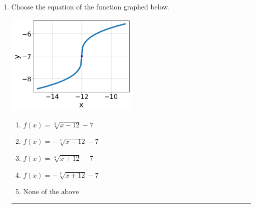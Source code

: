 \documentclass[14pt]{extbook}
\newcommand{\litem}[1]{\item#1\hspace*{-1cm}\rule{\textwidth}{0.4pt}}
\begin{document}
\begin{enumerate}
{\begin{enumerate}[label=\Alph*.]
\end{enumerate} }
\litem{
Choose the equation of the function graphed below.
\begin{center}
    \includegraphics[width=0.5\textwidth]{../Figures/radicalGraphToEquationC.png}
\end{center}
\begin{enumerate}[label=\Alph*.]
\item \( f(x) = \sqrt[3]{x - 12} - 7 \)
\item \( f(x) = - \sqrt[3]{x - 12} - 7 \)
\item \( f(x) = \sqrt[3]{x + 12} - 7 \)
\item \( f(x) = - \sqrt[3]{x + 12} - 7 \)
\item \( \text{None of the above} \)


\end{enumerate}}
\end{enumerate}
\end{document}
